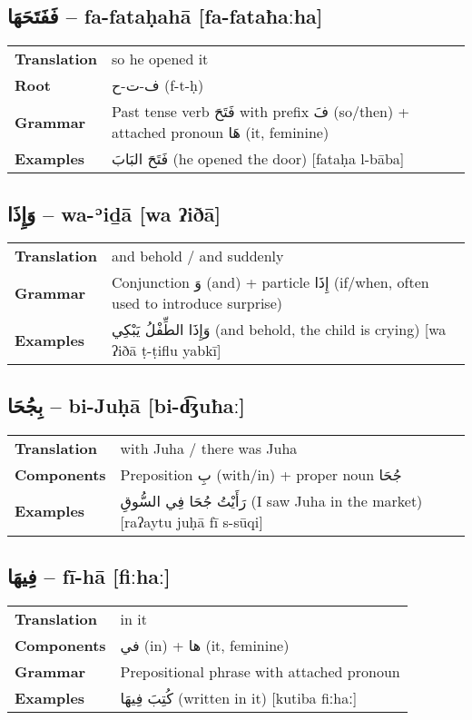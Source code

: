 \documentclass[a4paper,12pt]{article}
\begin{document}
\subsection{\textarabic{فَفَتَحَهَا} – \textbf{fa-fataḥahā} [fa-fataħaːha]}
\begin{tabular}{p{3cm}p{10cm}}
\toprule
\textbf{Translation} & so he opened it \\
\textbf{Root} & \textarabic{ف-ت-ح} (f-t-ḥ) \\
\textbf{Grammar} & Past tense verb \textarabic{فَتَحَ} with prefix \textarabic{فَ} (so/then) + attached pronoun \textarabic{هَا} (it, feminine) \\
\textbf{Examples} & \textarabic{فَتَحَ البَابَ} (he opened the door) [fataḥa l-bāba] \\
\bottomrule
\end{tabular}

\subsection{\textarabic{وَإِذَا} – \textbf{wa-ʾiḏā} [wa ʔiðā]}
\begin{tabular}{p{3cm}p{10cm}}
\toprule
\textbf{Translation} & and behold / and suddenly \\
\textbf{Grammar} & Conjunction \textarabic{وَ} (and) + particle \textarabic{إِذَا} (if/when, often used to introduce surprise) \\
\textbf{Examples} & \textarabic{وَإِذَا الطِّفْلُ يَبْكِي} (and behold, the child is crying) [wa ʔiðā ṭ-ṭiflu yabkī] \\
\bottomrule
\end{tabular}

\subsection{\textarabic{بِجُحَا} – \textbf{bi-Juḥā} [bi-d͡ʒuħaː]}
\begin{tabular}{p{3cm}p{10cm}}
\toprule
\textbf{Translation} & with Juha / there was Juha \\
\textbf{Components} & Preposition \textarabic{بِ} (with/in) + proper noun \textarabic{جُحَا} \\
\textbf{Examples} & \textarabic{رَأَيْتُ جُحَا فِي السُّوقِ} (I saw Juha in the market) [raʔaytu juḥā fī s-sūqi] \\
\bottomrule
\end{tabular}

\subsection{\textarabic{فِيهَا} – \textbf{fī-hā} [fiːhaː]}
\begin{tabular}{p{3cm}p{10cm}}
\toprule
\textbf{Translation} & in it \\
\textbf{Components} & \textarabic{في} (in) + \textarabic{ها} (it, feminine) \\
\textbf{Grammar} & Prepositional phrase with attached pronoun \\
\textbf{Examples} & \textarabic{كُتِبَ فِيهَا} (written in it) [kutiba fiːhaː] \\
\bottomrule
\end{tabular}
\end{document}
